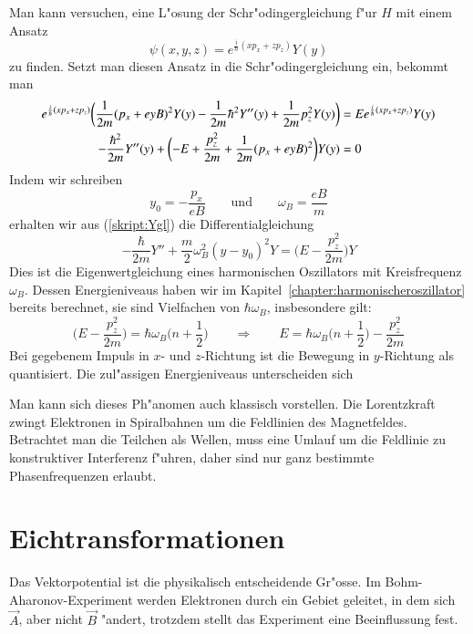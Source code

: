 Man kann versuchen, eine L"osung der Schr"odingergleichung f"ur $H$ mit
einem Ansatz
\[
\psi(x,y,z)
=
e^{\frac{i}{\hbar}(xp_x+zp_z)}Y(y)
\]
zu finden.
Setzt man diesen Ansatz in die Schr"odingergleichung ein, bekommt man
\begin{align}
e^{\frac{i}{\hbar}(xp_x+zp_z)}
\biggl(
\frac1{2m}
(p_x+eyB)^2
Y(y)
-
\frac1{2m}
\hbar^2 Y''(y)
+
\frac1{2m}p_z^2
Y(y)
\biggr)
&=
E
e^{\frac{i}{\hbar}(xp_x+zp_z)}
Y(y)
\notag
\\
-\frac{\hbar^2}{2m} Y''(y)
+
\biggl(
-E
+
\frac{ p_z^2}{2m}
+
\frac1{2m}
(p_x+eyB)^2
\biggr)
Y(y)
&=
0
\label{skript:Ygl}
\end{align}
Indem wir schreiben
\[
y_0=-\frac{p_x}{eB}
\qquad
\text{und}
\qquad
\omega_B
=\frac{eB}{m}
\]
erhalten wir aus (\ref{skript:Ygl}) die Differentialgleichung
\begin{equation}
-\frac{\hbar}{2m}Y''
+\frac{m}2\omega_B^2(y-y_0)^2Y
=
\biggl(E-\frac{p_z^2}{2m}\biggr) Y
\label{skript:landauniveaus}
\end{equation}
Dies ist die Eigenwertgleichung eines harmonischen Oszillators mit
Kreisfrequenz $\omega_B$.
Dessen Energieniveaus haben wir im Kapitel~\ref{chapter:harmonischeroszillator}
bereits berechnet, sie sind Vielfachen von $\hbar\omega_B$, insbesondere
gilt:
\[
\biggl(E-\frac{p_z^2}{2m}\biggr) = \hbar\omega_B\biggl(n+\frac12\biggr)
\qquad\Rightarrow\qquad
E=
\hbar\omega_B\biggl(n+\frac12\biggr)
-
\frac{p_z^2}{2m}
\]
Bei gegebenem Impuls in $x$- und $z$-Richtung ist die Bewegung in
$y$-Richtung als quantisiert.
Die zul"assigen Energieniveaus unterscheiden sich 

Man kann sich dieses Ph"anomen auch klassisch vorstellen.
Die Lorentzkraft zwingt Elektronen in Spiralbahnen um die Feldlinien des
Magnetfeldes.
Betrachtet man die Teilchen als Wellen, muss eine Umlauf um die
Feldlinie zu konstruktiver Interferenz f"uhren, daher sind nur
ganz bestimmte Phasenfrequenzen erlaubt.

%
%
\section{Eichtransformationen\label{section:eichtransformation}}
Das Vektorpotential ist die physikalisch entscheidende Gr"osse.
Im Bohm-Aharonov-Experiment
werden Elektronen durch ein Gebiet geleitet, in dem sich $\vec A$,
aber nicht $\vec B$ "andert, trotzdem stellt das Experiment eine
Beeinflussung fest.

